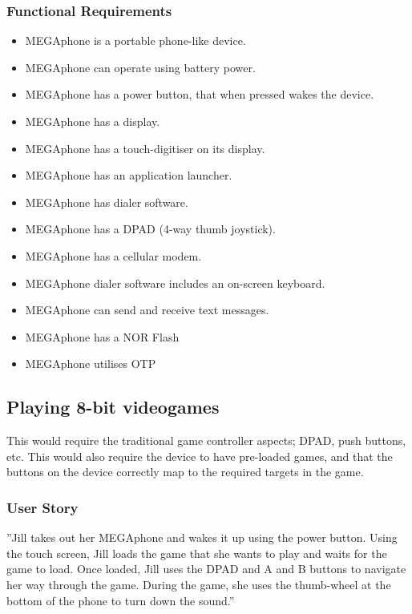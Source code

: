         \subsubsection{Functional Requirements}
        \begin{itemize}
        \item MEGAphone is a portable phone-like device.
        \item MEGAphone can operate using battery power.
        \item MEGAphone has a power button, that when pressed wakes the device.
        \item MEGAphone has a display.
        \item MEGAphone has a touch-digitiser on its display.
        \item MEGAphone has an application launcher.
        \item MEGAphone has dialer software.
        \item MEGAphone has a DPAD (4-way thumb joystick).
        \item MEGAphone has a cellular modem.
	\item MEGAphone dialer software includes an on-screen keyboard.
	\item MEGAphone can send and receive text messages.
	\item MEGAphone has a NOR Flash
	\item MEGAphone utilises OTP
        \end{itemize}

\subsection{Playing 8-bit videogames}
	This would require the traditional game controller aspects; DPAD, push buttons, etc. This would also require the device to have pre-loaded games, and that the buttons on the device correctly map to the required targets in the game.\\

	\subsubsection{User Story}
	''Jill takes out her MEGAphone and wakes it up using the power button. Using the touch screen, Jill loads the game that she wants to play and waits for the game to load. Once loaded, Jill uses the DPAD and A and B buttons to navigate her way through the game. During the game, she uses the thumb-wheel at the bottom of the phone to turn down the sound.''

